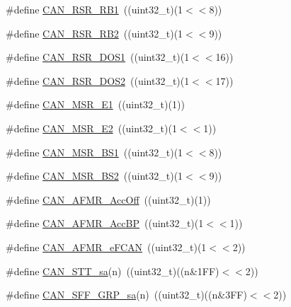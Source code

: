 \begin{DoxyCompactItemize}
\item 
\#define \hyperlink{group___c_a_n___private___macros_gab805c971503c3ad9c468dd74037f767e}{\-C\-A\-N\-\_\-\-R\-S\-R\-\_\-\-R\-B1}~((uint32\-\_\-t)(1$<$$<$8))
\item 
\#define \hyperlink{group___c_a_n___private___macros_gab1ac3e4e0123263cfa50ea300e9db6ef}{\-C\-A\-N\-\_\-\-R\-S\-R\-\_\-\-R\-B2}~((uint32\-\_\-t)(1$<$$<$9))
\item 
\#define \hyperlink{group___c_a_n___private___macros_gacae52bd8e9523dac3a1c45460e9a4473}{\-C\-A\-N\-\_\-\-R\-S\-R\-\_\-\-D\-O\-S1}~((uint32\-\_\-t)(1$<$$<$16))
\item 
\#define \hyperlink{group___c_a_n___private___macros_ga958438c2212191108845c719d2fbbf6c}{\-C\-A\-N\-\_\-\-R\-S\-R\-\_\-\-D\-O\-S2}~((uint32\-\_\-t)(1$<$$<$17))
\item 
\#define \hyperlink{group___c_a_n___private___macros_ga5ca2749c14cc8c75f6ee05268c111295}{\-C\-A\-N\-\_\-\-M\-S\-R\-\_\-\-E1}~((uint32\-\_\-t)(1))
\item 
\#define \hyperlink{group___c_a_n___private___macros_ga7edc55854d6ac26635a8580a8bc907c1}{\-C\-A\-N\-\_\-\-M\-S\-R\-\_\-\-E2}~((uint32\-\_\-t)(1$<$$<$1))
\item 
\#define \hyperlink{group___c_a_n___private___macros_gabcc3d8a6efc53e7e6ef395d873106b4a}{\-C\-A\-N\-\_\-\-M\-S\-R\-\_\-\-B\-S1}~((uint32\-\_\-t)(1$<$$<$8))
\item 
\#define \hyperlink{group___c_a_n___private___macros_gae037dc358b9d57bcae58904a46a5c32f}{\-C\-A\-N\-\_\-\-M\-S\-R\-\_\-\-B\-S2}~((uint32\-\_\-t)(1$<$$<$9))
\item 
\#define \hyperlink{group___c_a_n___private___macros_gac7547bc4c5373df98d6c78eba6e5b19a}{\-C\-A\-N\-\_\-\-A\-F\-M\-R\-\_\-\-Acc\-Off}~((uint32\-\_\-t)(1))
\item 
\#define \hyperlink{group___c_a_n___private___macros_ga5898b392a8238963da2b27a56c5cfa01}{\-C\-A\-N\-\_\-\-A\-F\-M\-R\-\_\-\-Acc\-B\-P}~((uint32\-\_\-t)(1$<$$<$1))
\item 
\#define \hyperlink{group___c_a_n___private___macros_ga1644f1f446eeb4491a5da909000701b2}{\-C\-A\-N\-\_\-\-A\-F\-M\-R\-\_\-e\-F\-C\-A\-N}~((uint32\-\_\-t)(1$<$$<$2))
\item 
\#define \hyperlink{group___c_a_n___private___macros_ga208d9de8a4b93f05002e5df15e42d628}{\-C\-A\-N\-\_\-\-S\-T\-T\-\_\-sa}(n)~((uint32\-\_\-t)((n\&1\-F\-F)$<$$<$2))
\item 
\#define \hyperlink{group___c_a_n___private___macros_gacd06b3da4567b09cc074f273b8779ab6}{\-C\-A\-N\-\_\-\-S\-F\-F\-\_\-\-G\-R\-P\-\_\-sa}(n)~((uint32\-\_\-t)((n\&3\-F\-F)$<$$<$2))
$$
\end{DoxyCompactItemize}
